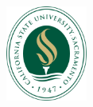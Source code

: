 \begin{titlepage}
	\begin{center}
		\includegraphics[width=0.2\textwidth]{./library/logo}~\\[1cm]
	\end{center}
\end{titlepage}